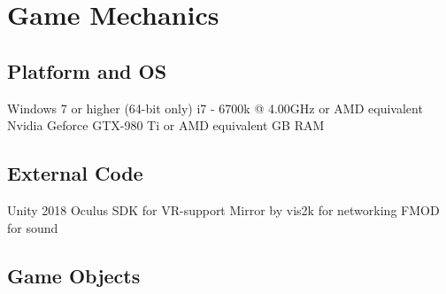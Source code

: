 \documentclass[11pt]{article}
\begin{document}
\newpage
\tableofcontents

\newpage
{}
\section{Game Mechanics}
\subsection{Platform and OS}
Windows 7 or higher (64-bit only)
\newline i7 - 6700k @ 4.00GHz or AMD equivalent
\newline Nvidia Geforce GTX-980 Ti or AMD equivalent
 GB RAM

\subsection{External Code}
Unity 2018
\newline Oculus SDK for VR-support
\newline Mirror by vis2k for networking
\newline FMOD for sound

\newpage

\subsection{Game Objects}
\end{document}
